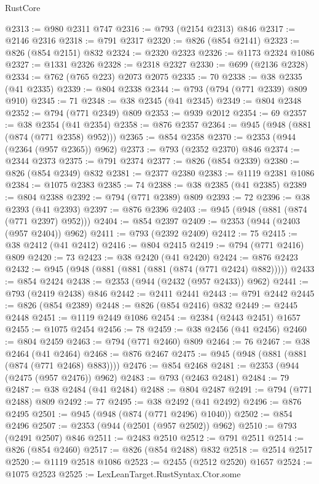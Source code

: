 \begin{lexlean}{RustCore}
\begin{coremodule}
@2313 := @980 @2311 @747
@2316 := @793 (@2154 @2313) @846
@2317 := @2146 @2316
@2318 := @791 @2317
@2320 := @826 (@854 @2141)
@2323 := @826 (@854 @2151) @832
@2324 := @2320 @2323
@2326 := @1173 @2324 @1086
@2327 := @1331 @2326
@2328 := @2318 @2327
@2330 := @699 (@2136 @2328)
@2334 := @762 (@765 @223) @2073 @2075
@2335 := 70
@2338 := @38 @2335 (@41 @2335)
@2339 := @804 @2338
@2344 := @793 (@794 (@771 @2339) @809 @910)
@2345 := 71
@2348 := @38 @2345 (@41 @2345)
@2349 := @804 @2348
@2352 := @794 (@771 @2349) @809
@2353 := @939 @2012
@2354 := 69
@2357 := @38 @2354 (@41 @2354)
@2358 := @876 @2357
@2364 := @945 (@948 (@881 (@874 (@771 @2358) @952)))
@2365 := @854 @2358
@2370 := @2353 (@944 (@2364 (@957 @2365)) @962)
@2373 := @793 (@2352 @2370) @846
@2374 := @2344 @2373
@2375 := @791 @2374
@2377 := @826 (@854 @2339)
@2380 := @826 (@854 @2349) @832
@2381 := @2377 @2380
@2383 := @1119 @2381 @1086
@2384 := @1075 @2383
@2385 := 74
@2388 := @38 @2385 (@41 @2385)
@2389 := @804 @2388
@2392 := @794 (@771 @2389) @809
@2393 := 72
@2396 := @38 @2393 (@41 @2393)
@2397 := @876 @2396
@2403 := @945 (@948 (@881 (@874 (@771 @2397) @952)))
@2404 := @854 @2397
@2409 := @2353 (@944 (@2403 (@957 @2404)) @962)
@2411 := @793 (@2392 @2409)
@2412 := 75
@2415 := @38 @2412 (@41 @2412)
@2416 := @804 @2415
@2419 := @794 (@771 @2416) @809
@2420 := 73
@2423 := @38 @2420 (@41 @2420)
@2424 := @876 @2423
@2432 := @945 (@948 (@881 (@881 (@881 (@874 (@771 @2424) @882)))))
@2433 := @854 @2424
@2438 := @2353 (@944 (@2432 (@957 @2433)) @962)
@2441 := @793 (@2419 @2438) @846
@2442 := @2411 @2441
@2443 := @791 @2442
@2445 := @826 (@854 @2389)
@2448 := @826 (@854 @2416) @832
@2449 := @2445 @2448
@2451 := @1119 @2449 @1086
@2454 := @2384 (@2443 @2451) @1657
@2455 := @1075 @2454
@2456 := 78
@2459 := @38 @2456 (@41 @2456)
@2460 := @804 @2459
@2463 := @794 (@771 @2460) @809
@2464 := 76
@2467 := @38 @2464 (@41 @2464)
@2468 := @876 @2467
@2475 := @945 (@948 (@881 (@881 (@874 (@771 @2468) @883))))
@2476 := @854 @2468
@2481 := @2353 (@944 (@2475 (@957 @2476)) @962)
@2483 := @793 (@2463 @2481)
@2484 := 79
@2487 := @38 @2484 (@41 @2484)
@2488 := @804 @2487
@2491 := @794 (@771 @2488) @809
@2492 := 77
@2495 := @38 @2492 (@41 @2492)
@2496 := @876 @2495
@2501 := @945 (@948 (@874 (@771 @2496) @1040))
@2502 := @854 @2496
@2507 := @2353 (@944 (@2501 (@957 @2502)) @962)
@2510 := @793 (@2491 @2507) @846
@2511 := @2483 @2510
@2512 := @791 @2511
@2514 := @826 (@854 @2460)
@2517 := @826 (@854 @2488) @832
@2518 := @2514 @2517
@2520 := @1119 @2518 @1086
@2523 := @2455 (@2512 @2520) @1657
@2524 := @1075 @2523
@2525 := LexLeanTarget.RustSyntax.Ctor.some

\end{coremodule}
\end{lexlean}
